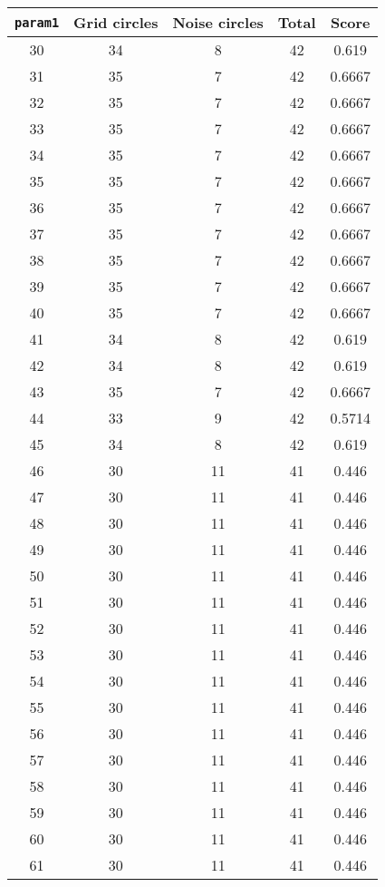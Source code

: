 \documentclass[letterpaper, 12pt]{article}
\begin{document}
\begin{longtable}{|c|c|c|c|c|}
\hline
\textbf{\texttt{param1}} & \textbf{Grid circles} & \textbf{Noise circles} & \textbf{Total} & \textbf{Score} \\
\hline
30 & 34 & 8 & 42 & 0.619 \\
\hline
31 & 35 & 7 & 42 & 0.6667 \\
\hline
32 & 35 & 7 & 42 & 0.6667 \\
\hline
33 & 35 & 7 & 42 & 0.6667 \\
\hline
34 & 35 & 7 & 42 & 0.6667 \\
\hline
35 & 35 & 7 & 42 & 0.6667 \\
\hline
36 & 35 & 7 & 42 & 0.6667 \\
\hline
37 & 35 & 7 & 42 & 0.6667 \\
\hline
38 & 35 & 7 & 42 & 0.6667 \\
\hline
39 & 35 & 7 & 42 & 0.6667 \\
\hline
40 & 35 & 7 & 42 & 0.6667 \\
\hline
41 & 34 & 8 & 42 & 0.619 \\
\hline
42 & 34 & 8 & 42 & 0.619 \\
\hline
43 & 35 & 7 & 42 & 0.6667 \\
\hline
44 & 33 & 9 & 42 & 0.5714 \\
\hline
45 & 34 & 8 & 42 & 0.619 \\
\hline
46 & 30 & 11 & 41 & 0.446 \\
\hline
47 & 30 & 11 & 41 & 0.446 \\
\hline
48 & 30 & 11 & 41 & 0.446 \\
\hline
49 & 30 & 11 & 41 & 0.446 \\
\hline
50 & 30 & 11 & 41 & 0.446 \\
\hline
51 & 30 & 11 & 41 & 0.446 \\
\hline
52 & 30 & 11 & 41 & 0.446 \\
\hline
53 & 30 & 11 & 41 & 0.446 \\
\hline
54 & 30 & 11 & 41 & 0.446 \\
\hline
55 & 30 & 11 & 41 & 0.446 \\
\hline
56 & 30 & 11 & 41 & 0.446 \\
\hline
57 & 30 & 11 & 41 & 0.446 \\
\hline
58 & 30 & 11 & 41 & 0.446 \\
\hline
59 & 30 & 11 & 41 & 0.446 \\
\hline
60 & 30 & 11 & 41 & 0.446 \\
\hline
61 & 30 & 11 & 41 & 0.446 \\

\end{longtable}
\end{document}
